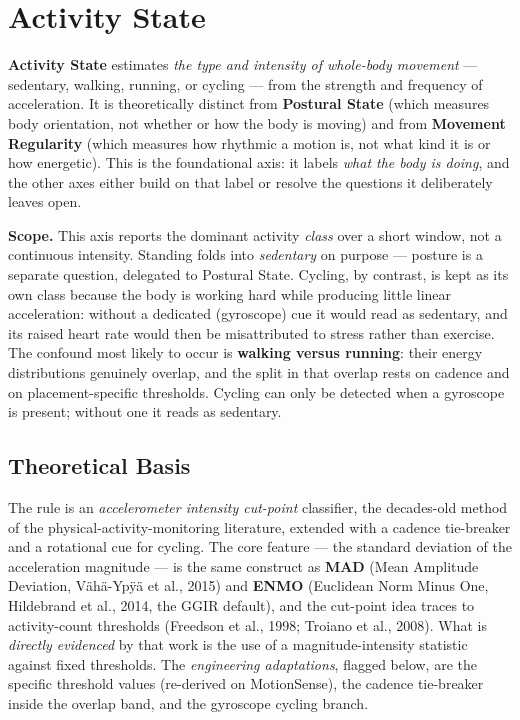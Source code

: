 \chapter{Activity State}

\noindent\textbf{Activity State} estimates \textit{the type and intensity of whole-body
movement} --- sedentary, walking, running, or cycling --- from the strength and frequency
of acceleration. It is theoretically distinct from \textbf{Postural State} (which measures
body orientation, not whether or how the body is moving) and from \textbf{Movement
Regularity} (which measures how rhythmic a motion is, not what kind it is or how energetic).
This is the foundational axis: it labels \emph{what the body is doing}, and the other axes
either build on that label or resolve the questions it deliberately leaves open.

\begin{callout}
\textbf{Scope.} This axis reports the dominant activity \emph{class} over a short window,
not a continuous intensity. Standing folds into \emph{sedentary} on purpose --- posture is a
separate question, delegated to Postural State. Cycling, by contrast, is kept as its own
class because the body is working hard while producing little linear acceleration: without a
dedicated (gyroscope) cue it would read as sedentary, and its raised heart rate would then be
misattributed to stress rather than exercise. The confound most likely to occur is
\textbf{walking versus running}: their energy distributions genuinely overlap, and the split
in that overlap rests on cadence and on placement-specific thresholds. Cycling can only be
detected when a gyroscope is present; without one it reads as sedentary.
\end{callout}

\section{Theoretical Basis}

The rule is an \emph{accelerometer intensity cut-point} classifier, the decades-old method
of the physical-activity-monitoring literature, extended with a cadence tie-breaker and a
rotational cue for cycling. The core feature --- the standard deviation of the acceleration
magnitude --- is the same construct as \textbf{MAD} (Mean Amplitude Deviation,
V\"ah\"a-Yp\"y\"a et al., 2015) and \textbf{ENMO} (Euclidean Norm Minus One, Hildebrand et
al., 2014, the GGIR default), and the cut-point idea traces to activity-count thresholds
(Freedson et al., 1998; Troiano et al., 2008). What is \emph{directly evidenced} by that
work is the use of a magnitude-intensity statistic against fixed thresholds. The
\emph{engineering adaptations}, flagged below, are the specific threshold values (re-derived
on MotionSense), the cadence tie-breaker inside the overlap band, and the gyroscope cycling
branch.

